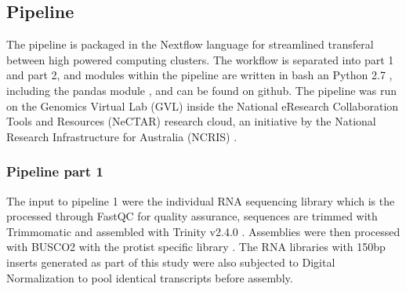 \documentclass[12pt]{article}
\begin{document}
\subsection*{Pipeline}
The pipeline is packaged in the Nextflow language \cite{nextflow} for streamlined transferal between high powered computing clusters. 
The workflow is separated into part 1 and part 2, and modules within the pipeline are written in bash an Python 2.7 \cite{python}, including the pandas module \cite{pandas}, and can be found on github. The pipeline was run on the Genomics Virtual Lab (GVL) \cite{afgan2015genomics} inside the National eResearch Collaboration Tools and Resources (NeCTAR) research cloud, an initiative by the National Research Infrastructure for Australia (NCRIS) \cite{nectar}.
\subsubsection*{Pipeline part 1}
The input to pipeline 1 were the individual RNA sequencing library which is the processed through FastQC \cite{fastqc} for quality assurance, sequences are trimmed with Trimmomatic \cite{bolger2014trimmomatic} and assembled with Trinity v2.4.0 \cite{haas2013novo}. 
Assemblies were then processed with BUSCO2 with the protist specific library \cite{simao2015busco}.
The RNA libraries with 150bp inserts generated as part of this study were also subjected to Digital Normalization \cite{diginorm} to pool identical transcripts before assembly.                                                                                                                                                                                                                                                                                                                                                                                                                                                                                                                                                                                                                                                                                                                                                                                                                                                                                                                                                                                                                                                                                                                                                                                                                                                                                                                                           
\end{document}
